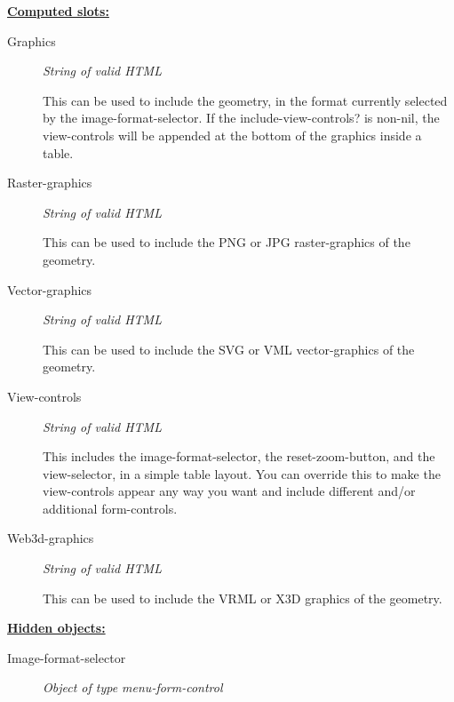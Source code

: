 \documentclass [11pt]{book}
\begin{document}
\begin{itemize}
\textbf{
\underline{Computed slots:}}

\begin{description}

\item [Graphics]
\emph{String of valid HTML}

 This can be used to
include the geometry, in the format currently selected by the image-format-selector.
If the include-view-controls? is non-nil, the view-controls will be appended at the
bottom of the graphics inside a table.




\item [Raster-graphics]
\emph{String of valid HTML}

 This can be used to
include the PNG or JPG raster-graphics of the geometry.




\item [Vector-graphics]
\emph{String of valid HTML}

 This can be used to
include the SVG or VML vector-graphics of the geometry.




\item [View-controls]
\emph{String of valid HTML}

 This includes the image-format-selector, the reset-zoom-button,
and the view-selector, in a simple table layout. You can override this to make the view-controls
appear any way you want and include different and/or additional form-controls.




\item [Web3d-graphics]
\emph{String of valid HTML}

 This can be used to
include the VRML or X3D graphics of the geometry.




\end{description}






\textbf{
\underline{Hidden objects:}}

\begin{description}

\item [Image-format-selector]
\emph{Object of type menu-form-control}


\end{description}
\end{itemize}
\end{document}

